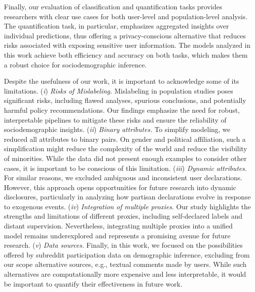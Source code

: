 Finally, our evaluation of classification and quantification tasks provides researchers with clear use cases for both user-level and population-level analysis.
The quantification task, in particular, emphasizes aggregated insights over individual predictions, thus offering a privacy-conscious alternative that reduces risks associated with exposing sensitive user information.
The models analyzed in this work achieve both efficiency and accuracy on both tasks, which makes them a robust choice for sociodemographic inference.

Despite the usefulness of our work, it is important to acknowledge some of its limitations.
(\emph{i}) \textit{Risks of Mislabeling.}
Mislabeling in population studies poses significant risks, including flawed analyses, spurious conclusions, and potentially harmful policy recommendations. Our findings emphasize the need for robust, interpretable pipelines to mitigate these risks and ensure the reliability of sociodemographic insights.
(\emph{ii}) \textit{Binary attributes.}
To simplify modeling, we reduced all attributes to binary pairs.
On gender and political affiliation, such a simplification might reduce the complexity of the world and reduce the visibility of minorities.
While the data did not present enough examples to consider other cases, it is important to be conscious of this limitation.
(\emph{iii}) \textit{Dynamic attributes.}
For similar reasons, we excluded ambiguous and inconsistent user declarations. However, this approach opens opportunities for future research into dynamic disclosures, particularly in analyzing how partisan declarations evolve in response to exogenous events.
(\emph{iv}) \textit{Integration of multiple proxies.}
Our study highlights the strengths and limitations of different proxies, including self-declared labels and distant supervision.
Nevertheless, integrating multiple proxies into a unified model remains underexplored and represents a promising avenue for future research.
(\emph{v}) \textit{Data sources.}
Finally, in this work, we focused on the possibilities offered by subreddit participation data on demographic inference, excluding from our scope alternative sources, e.g., textual comments made by users.
While such alternatives are computationally more expensive and less interpretable, it would be important to quantify their effectiveness in future work.
